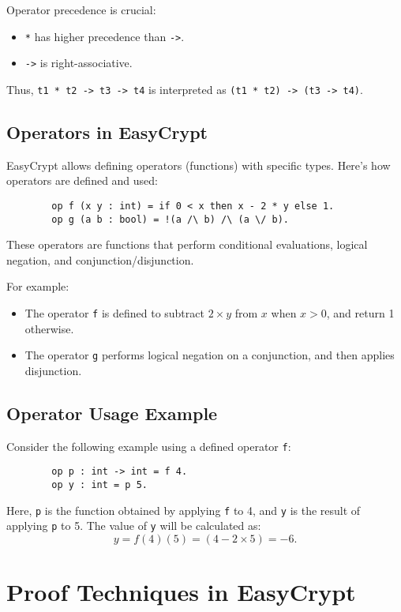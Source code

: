 \documentclass{article}
\begin{document}
	Operator precedence is crucial:
	\begin{itemize}
		\item \texttt{*} has higher precedence than \texttt{->}.
		\item \texttt{->} is right-associative.
	\end{itemize}
	
	Thus, \texttt{t1 * t2 -> t3 -> t4} is interpreted as \texttt{(t1 * t2) -> (t3 -> t4)}.
	
	\subsection{Operators in EasyCrypt}
	
	EasyCrypt allows defining operators (functions) with specific types. Here's how operators are defined and used:
	\begin{verbatim}
		op f (x y : int) = if 0 < x then x - 2 * y else 1.
		op g (a b : bool) = !(a /\ b) /\ (a \/ b).
	\end{verbatim}
	These operators are functions that perform conditional evaluations, logical negation, and conjunction/disjunction.
	
	For example:
	\begin{itemize}
		\item The operator \texttt{f} is defined to subtract \(2 \times y\) from \(x\) when \(x > 0\), and return 1 otherwise.
		\item The operator \texttt{g} performs logical negation on a conjunction, and then applies disjunction.
	\end{itemize}
	
	\subsection{Operator Usage Example}
	
	Consider the following example using a defined operator \texttt{f}:
	
	\begin{verbatim}
		op p : int -> int = f 4.
		op y : int = p 5.
	\end{verbatim}
	Here, \texttt{p} is the function obtained by applying \texttt{f} to 4, and \texttt{y} is the result of applying \texttt{p} to 5. The value of \texttt{y} will be calculated as:
	\[
	y = f(4)(5) = (4 - 2 \times 5) = -6.
	\]
	
	\section{Proof Techniques in EasyCrypt}
	
\end{document}
